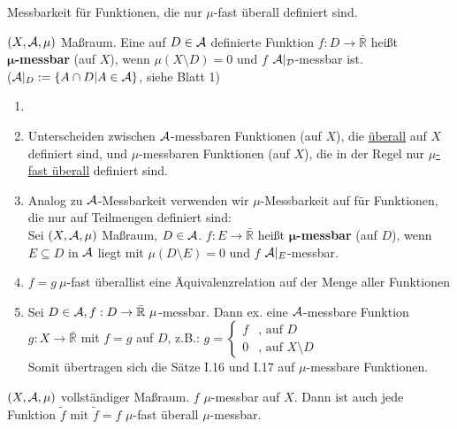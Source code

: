   \begin{goal}
    Messbarkeit für Funktionen, die nur $\mu$-fast überall definiert sind.
  \end{goal}

  \begin{definition}
    $(X, \mathcal{A}, \mu)$ Maßraum. Eine auf $D \in \mathcal{A}$ definierte Funktion $f: D \to \bar{\mathbb{R}}$ heißt\\
    $\bm{\mu}$\textbf{-messbar} (auf $X$), wenn $\mu(X \setminus D) = 0$ und $f$ $\mathcal{A|_D}$-messbar ist.\\
    ($\mathcal{A}|_D := \{A \cap D | A \in \mathcal{A}\}$, siehe Blatt 1)
  \end{definition}

  \begin{remark}
    \begin{enumerate}
      \item[]
      \item Unterscheiden zwischen $\mathcal{A}$-messbaren Funktionen (auf $X$), die \underline{überall} auf $X$ definiert sind, und $\mu$-messbaren Funktionen (auf $X$), die in der Regel nur \underline{$\mu$-fast überall} definiert sind.
      \item Analog zu $\mathcal{A}$-Messbarkeit verwenden wir $\mu$-Messbarkeit auf für Funktionen, die nur auf Teilmengen definiert sind:\\
        Sei $(X, \mathcal{A}, \mu)$ Maßraum, $D \in \mathcal{A}$. $f: E \to \bar{\mathbb{R}}$ heißt \textbf{$\bm{\mu}$-messbar} (auf $D$), wenn $E \subseteq D$ in $\mathcal{A}$ liegt mit $\mu(D \setminus E) = 0$ und $f$ $\mathcal{A}|_E$-messbar.
      \item \glqq$f=g \ \mu$-fast überall\grqq ist eine Äquivalenzrelation auf der Menge aller Funktionen
      \item Sei $D \in \mathcal{A}, f: D \to \bar{\mathbb{R}}\ \mu$-messbar. Dann ex. eine $\mathcal{A}$-messbare Funktion $g: X \to \bar{\mathbb{R}}$ mit $f=g$ auf $D$, z.B.: $g = \begin{cases}
        f & \text{, auf } D\\
        0 & \text{, auf } X \setminus D 
      \end{cases}$\\
      Somit übertragen sich die Sätze I.16 und I.17 auf $\mu$-messbare Funktionen.
    \end{enumerate}
  \end{remark}

  \newpage
  \begin{lemma}
    $(X, \mathcal{A}, \mu)$ vollständiger Maßraum. $f$ $\mu$-messbar auf $X$. Dann ist auch jede Funktion $\tilde{f}$ mit $\tilde{f}=f$ $\mu$-fast überall $\mu$-messbar.
  \end{lemma}

